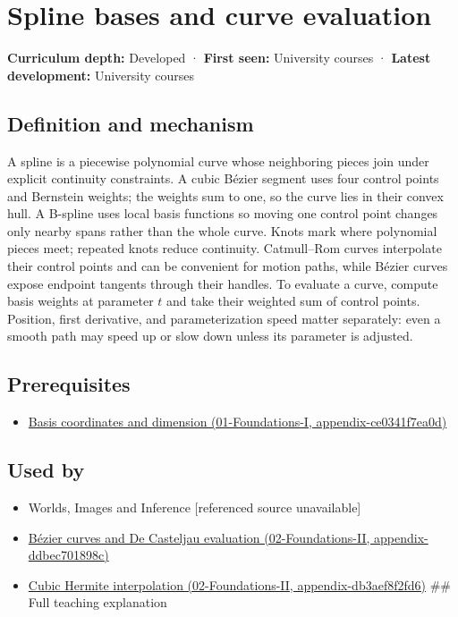 \hypertarget{appendix-f28eeec97a3d}{}
\section{Spline bases and curve evaluation}\label{appendix-f28eeec97a3d-spline-bases-and-curve-evaluation}

\textbf{Curriculum depth:} Developed · \textbf{First seen:} University courses · \textbf{Latest development:} University courses

\subsection{Definition and mechanism}\label{appendix-f28eeec97a3d-definition-and-mechanism}

A spline is a piecewise polynomial curve whose neighboring pieces join under explicit continuity constraints. A cubic Bézier segment uses four control points and Bernstein weights; the weights sum to one, so the curve lies in their convex hull. A B-spline uses local basis functions so moving one control point changes only nearby spans rather than the whole curve. Knots mark where polynomial pieces meet; repeated knots reduce continuity. Catmull--Rom curves interpolate their control points and can be convenient for motion paths, while Bézier curves expose endpoint tangents through their handles. To evaluate a curve, compute basis weights at parameter \(t\) and take their weighted sum of control points. Position, first derivative, and parameterization speed matter separately: even a smooth path may speed up or slow down unless its parameter is adjusted.

\subsection{Prerequisites}\label{appendix-f28eeec97a3d-prerequisites}

\begin{itemize}
\tightlist
\item
  \href{../01-Foundations-I/main.pdf\#nameddest=appendix-ce0341f7ea0d}{Basis coordinates and dimension (01-Foundations-I, appendix-ce0341f7ea0d)}
\end{itemize}

\subsection{Used by}\label{appendix-f28eeec97a3d-used-by}

\begin{itemize}
\item
  {Worlds, Images and Inference {[}referenced source unavailable{]}}
\item
  \href{../02-Foundations-II/main.pdf\#nameddest=appendix-ddbec701898c}{Bézier curves and De Casteljau evaluation (02-Foundations-II, appendix-ddbec701898c)}
\item
  \href{../02-Foundations-II/main.pdf\#nameddest=appendix-db3aef8f2fd6}{Cubic Hermite interpolation (02-Foundations-II, appendix-db3aef8f2fd6)} \#\# Full teaching explanation
\end{itemize}

